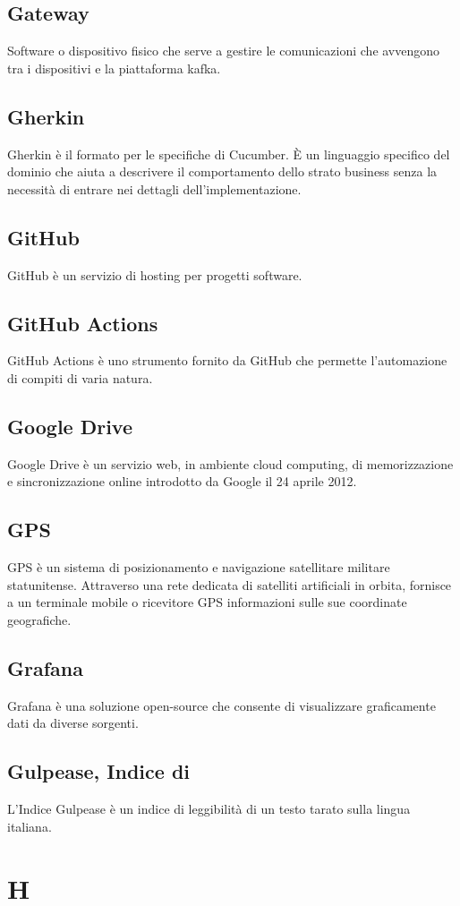 \subsection{Gateway}  Software o dispositivo fisico che serve a gestire le comunicazioni che avvengono tra i dispositivi e la piattaforma kafka.
\subsection{Gherkin}  Gherkin è il formato per le specifiche di Cucumber. È un linguaggio specifico del dominio che aiuta a descrivere il comportamento dello strato business senza la necessità di entrare nei dettagli dell'implementazione.
\subsection{GitHub}  GitHub è un servizio di hosting per progetti software.
\subsection{GitHub Actions}  GitHub Actions è uno strumento fornito da GitHub che permette l'automazione di compiti di varia natura.
\subsection{Google Drive}  Google Drive è un servizio web, in ambiente cloud computing, di memorizzazione e sincronizzazione online introdotto da Google il 24 aprile 2012.
\subsection{GPS}  GPS è un sistema di posizionamento e navigazione satellitare militare statunitense. Attraverso una rete dedicata di satelliti artificiali in orbita, fornisce a un terminale mobile o ricevitore GPS informazioni sulle sue coordinate geografiche.
\subsection{Grafana}  Grafana è una soluzione open-source che consente di visualizzare graficamente dati da diverse sorgenti.
\subsection{Gulpease, Indice di}  L'Indice Gulpease è un indice di leggibilità di un testo tarato sulla lingua italiana.


\newpage \section{H}
